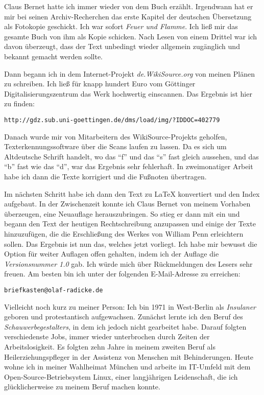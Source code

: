 \medskip

Claus Bernet hatte ich immer wieder von dem Buch erzählt. Irgendwann hat er mir
bei seinen Archiv-Recherchen das erste Kapitel der deutschen Übersetzung als
Fotokopie geschickt. Ich war sofort \textit{Feuer und
Flamme}. Ich ließ mir das gesamte Buch von ihm als Kopie schicken. Nach Lesen
von einem Drittel war
ich davon überzeugt, dass der Text unbedingt wieder allgemein zugänglich und
bekannt gemacht werden sollte.

\medskip

Dann begann ich in dem Internet-Projekt \textit{de.WikiSource.org} von meinen
Plänen
zu schreiben. Ich ließ für knapp hundert Euro vom Göttinger
Digitalisierungszentrum das Werk hochwertig einscannen. Das Ergebnis ist hier zu
finden:

\begin{center}
\texttt{http://gdz.sub.uni-goettingen.de/dms/load/img/?IDDOC=402779}
\end{center}

Danach wurde mir von Mitarbeitern des WikiSource-Projekts geholfen,
Texterkennungssoftware über die Scans laufen zu lassen. Da es sich um
Altdeutsche Schrift handelt, wo das "`f"' und das "`s"' fast gleich aussehen,
und das "`b"' fast wie das "`d"', war das Ergebnis sehr fehlerhaft. In
zweimonatiger Arbeit habe ich dann die Texte korrigiert und die Fußnoten
übertragen.

\medskip

Im nächsten Schritt habe ich dann den Text zu \LaTeX{} konvertiert und den Index
aufgebaut. In der Zwischenzeit konnte ich Claus Bernet von meinem Vorhaben
überzeugen, eine Neuauflage herauszubringen. So stieg er dann mit ein und begann
den Text der heutigen Rechtschreibung anzupassen und einige der Texte
hinzuzufügen, die die Erschließung des Werkes von William Penn erleichtern sollen.
Das Ergebnis ist nun das, welches jetzt vorliegt. Ich habe mir bewusst die
Option für weiter Auflagen offen gehalten, indem ich der Auflage die
\textit{Versionsnummer 1.0} gab. Ich würde mich über Rückmeldungen des Lesers
sehr freuen. Am besten bin ich unter der folgenden E-Mail-Adresse zu erreichen:

\begin{center}
\texttt{briefkasten@olaf-radicke.de}
\end{center}

Vielleicht noch kurz zu meiner Person: Ich bin 1971 in West-Berlin
als \textit{Insulaner} geboren und protestantisch aufgewachsen. Zunächst lernte
ich den Beruf des \textit{Schauwerbegestalters}, in dem ich jedoch nicht gearbeitet
habe. Darauf folgten verschiedenste Jobs, immer wieder unterbrochen durch Zeiten
der Arbeitslosigkeit. Es folgten zehn Jahre in meinem zweiten Beruf
als Heilerziehungspfleger in der Assistenz von Menschen mit Behinderungen.
Heute wohne ich in meiner Wahlheimat München und arbeite im IT-Umfeld mit dem
Open-Source-Betriebsystem Linux, einer langjährigen Leidenschaft, die ich
glücklicherweise zu meinem Beruf machen konnte.

